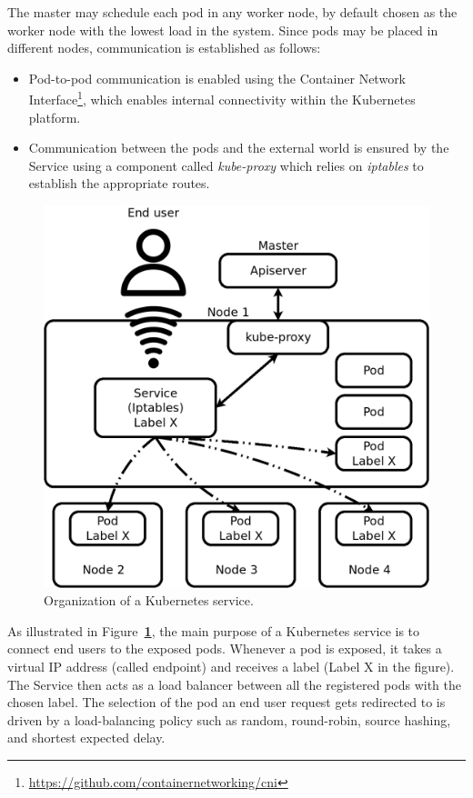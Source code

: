 \documentclass[letterpaper,twocolumn,10pt]{article}
\let\origref\ref
\def\ref#1{\textbf{\origref{#1}}}
\begin{document}
The master may schedule each pod in any worker node, by default chosen
as the worker node with the lowest load in the system. Since pods may
be placed in different nodes, communication is established as follows:

\begin{itemize}
\item Pod-to-pod communication is enabled using the Container Network
  Interface\footnote{\url{https://github.com/containernetworking/cni}},
  which enables internal connectivity within the Kubernetes platform.
\item Communication between the pods and the external world is ensured
  by the Service using a component called \emph{kube-proxy} which
  relies on \emph{iptables} to establish the appropriate routes.
\end{itemize}

\begin{figure}[t]
  \centering
  \includegraphics[width=.9\linewidth]{images/svc.png}
  \caption{Organization of a Kubernetes service.}
  \label{fig:svc}
\end{figure}

As illustrated in Figure~\ref{fig:svc}, the main purpose of a
Kubernetes service is to connect end users to the exposed
pods. Whenever a pod is exposed, it takes a virtual IP address (called
endpoint) and receives a label (Label X in the figure). The Service
then acts as a load balancer between all the registered pods with the
chosen label. The selection of the pod an end user request gets
redirected to is driven by a load-balancing policy such as random,
round-robin, source hashing, and shortest expected delay.
\end{document}
